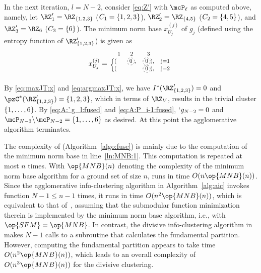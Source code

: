 \begin{example}
	In the next iteration, $l=N-2$, consider \eqref{eq:Z'} with $\mcP_{\ell}$ as computed above,
	namely, let $\RZ'_1 = \RZ_{\Set{1,2,3}}$ ($C_1=\{1,2,3\}$), $\RZ'_{2} = \RZ_{\Set{4,5}}$ ($C_2=\{4,5\}$), and $\RZ'_{3} = \RZ_{6}$ ($C_3=\{6\}$).
	The minimum norm base $x_{U_{j}}^{(j)}$ of $g_{j}$ (defined using the entropy function of
	$\RZ'_{\Set{1,2,3}}$) is given as
	\begin{align*}
		x_{U_j}^{(j)} =\scalebox{0.8}{
		\begin{blockarray}{rc c c}
			\phantom{n}1 & 2   & 3 \\
						\begin{block}{\{l cc c}
							(& \circled{0},   & \circled{0}),   & j=1 \\
							(&     &               \circled{0}),   & j=2 \\
						\end{block}
		\end{blockarray}}
		\end{align*}
	By \eqref{eq:maxJT:x} and \eqref{eq:argmaxJT:x}, we have
	$I^{*}(\RZ'_{\Set{1,2,3}}) = 0$ and $\pzC^{*}(\RZ'_{\Set{1,2,3}}) = \Set{1,2,3}$, which in terms of
	$\RZ_{V}$, results in the trivial cluster $\{1,\dots,6\}$.
	By \eqref{eq:A:`g_l:fused} and \eqref{eq:A:P_i-1:fused},
	$`g_{N-2}=0$ and $\mcP_{N-3} \backslash \mcP_{N-2} = \Set{1,\ldots,6}$ as desired.
	At this point the agglomerative algorithm
	terminates.
\end{example}


The complexity of \Agglomerate (Algorithm~\ref{algo:fuse}) is mainly due to the computation of the
minimum norm base in line~\ref{ln:MNB:1}.  This computation is repeated at most $n$ times.  With
$\op{MNB}(n)$ denoting the complexity of the minimum norm base algorithm for a ground set of size $n$,
\Agglomerate runs in time $O(n\op{MNB}(n))$. Since the agglomerative info-clustering algorithm in
Algorithm~\ref{alg:aic} invokes function \Agglomerate $N-1\leq n-1$ times, it runs in time $O(n^2
\op{MNB}(n))$, which is equivalent to that of~\cite[Algorithm~3]{chan16cluster}, assuming that the
submodular function minimization therein is implemented by the minimum norm base algorithm, i.e.,
with $\op{SFM}=\op{MNB}$. In contrast, the divisive info-clustering algorithm
in~\cite[Algorithm~2]{chan16cluster} makes $N-1$ calls to a subroutine that calculates the
fundamental partition. However, computing the fundamental partition appears to take time $O(n^2
\op{MNB}(n))$, which leads to an overall complexity of $O(n^3 \op{MNB}(n))$ for the divisive
clustering.

